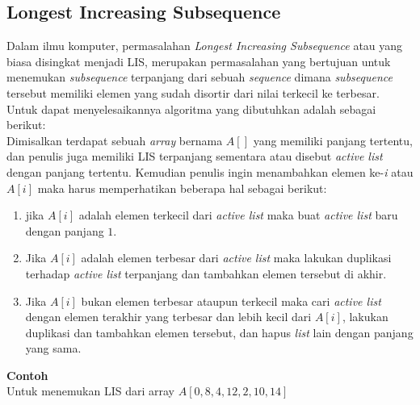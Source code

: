 \documentclass[a4paper]{IEEEtran}
\begin{document}
\subsection{Longest Increasing Subsequence}
Dalam ilmu komputer, permasalahan \textit{Longest Increasing Subsequence} atau yang biasa disingkat menjadi LIS, merupakan permasalahan yang bertujuan untuk menemukan \textit{subsequence} terpanjang dari sebuah \textit{sequence} dimana \textit{subsequence} tersebut memiliki elemen yang sudah disortir dari nilai terkecil ke terbesar.\\
Untuk dapat menyelesaikannya algoritma yang dibutuhkan adalah sebagai berikut:\\
Dimisalkan terdapat sebuah \textit{array} bernama $A[]$ yang memiliki panjang tertentu, dan penulis juga memiliki LIS terpanjang sementara atau disebut \textit{active list} dengan panjang tertentu. Kemudian penulis ingin menambahkan elemen ke-\textit{i} atau $A[\textit{i}]$ maka harus memperhatikan beberapa hal sebagai berikut\cite{LIS}:
\begin{enumerate}
	\item jika $A[\textit{i}]$ adalah elemen terkecil dari \textit{active list} maka buat \textit{active list} baru dengan panjang $1$.
	\item Jika $A[\textit{i}]$ adalah elemen terbesar dari \textit{active list} maka lakukan duplikasi terhadap \textit{active list} terpanjang dan tambahkan elemen tersebut di akhir.
	\item Jika $A[\textit{i}]$ bukan elemen terbesar ataupun terkecil maka cari \textit{active list} dengan elemen terakhir yang terbesar dan lebih kecil dari $A[\textit{i}]$, lakukan duplikasi dan tambahkan elemen tersebut, dan hapus \textit{list} lain dengan panjang yang sama.
\end{enumerate}
\textbf{Contoh}\\
Untuk menemukan LIS dari array $A[0,8,4,12,2,10,14]$
\end{document}
